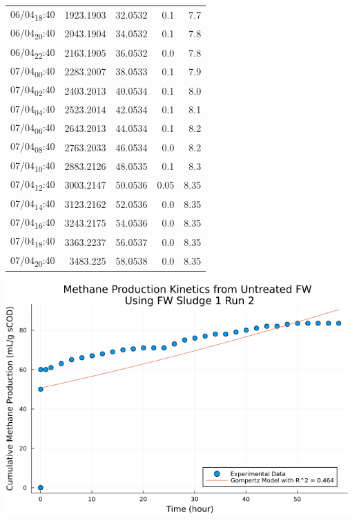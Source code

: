 \documentclass[11pt]{article}
\begin{document}
\begin{center}
\begin{tabular}{lrrrr}
06/04\textsubscript{18}:40 & 1923.1903 & 32.0532 & 0.1 & 7.7\\[0pt]
06/04\textsubscript{20}:40 & 2043.1904 & 34.0532 & 0.1 & 7.8\\[0pt]
06/04\textsubscript{22}:40 & 2163.1905 & 36.0532 & 0.0 & 7.8\\[0pt]
07/04\textsubscript{00}:40 & 2283.2007 & 38.0533 & 0.1 & 7.9\\[0pt]
07/04\textsubscript{02}:40 & 2403.2013 & 40.0534 & 0.1 & 8.0\\[0pt]
07/04\textsubscript{04}:40 & 2523.2014 & 42.0534 & 0.1 & 8.1\\[0pt]
07/04\textsubscript{06}:40 & 2643.2013 & 44.0534 & 0.1 & 8.2\\[0pt]
07/04\textsubscript{08}:40 & 2763.2033 & 46.0534 & 0.0 & 8.2\\[0pt]
07/04\textsubscript{10}:40 & 2883.2126 & 48.0535 & 0.1 & 8.3\\[0pt]
07/04\textsubscript{12}:40 & 3003.2147 & 50.0536 & 0.05 & 8.35\\[0pt]
07/04\textsubscript{14}:40 & 3123.2162 & 52.0536 & 0.0 & 8.35\\[0pt]
07/04\textsubscript{16}:40 & 3243.2175 & 54.0536 & 0.0 & 8.35\\[0pt]
07/04\textsubscript{18}:40 & 3363.2237 & 56.0537 & 0.0 & 8.35\\[0pt]
07/04\textsubscript{20}:40 & 3483.225 & 58.0538 & 0.0 & 8.35\\[0pt]
\end{tabular}
\end{center}


\begin{center}
\includegraphics[width=.9\linewidth]{../plots/BMPs/Untreated FW/methane_kinetics_untreated_fw_s1_r2_hour.png}
\end{center}
\end{document}
